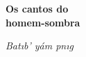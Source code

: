 \thispagestyle{empty}








\begingroup\thispagestyle{empty}\vspace*{.05\textheight} 

              \formular
              \huge
              \noindent
              \textbf{Os cantos do\\ homem-sombra}
              
              \vspace{0.3em}

              \noindent\Large\textit{Bat\i{}b’ yám p\I{}n\i{}g}
                    
\endgroup
\vfill
\pagebreak